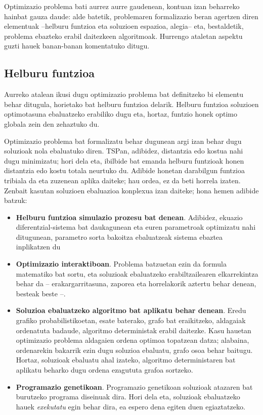 \documentclass[eu]{ifirak}\usepackage[]{graphicx}\usepackage[]{color}
\begin{document}
Optimizazio problema bati aurrez aurre gaudenean, kontuan izan beharreko hainbat gauza daude: alde batetik, problemaren formalizazio beran agertzen diren elementuak --helburu funtzioa eta soluzioen espazioa, alegia-- eta,  bestaldetik, problema ebazteko erabil daitezkeen algoritmoak. Hurrengo ataletan aspektu guzti hauek banan-banan komentatuko ditugu.

\subsection{Helburu funtzioa}

Aurreko atalean ikusi dugu optimizazio problema bat definitzeko bi elementu behar ditugula, horietako bat helburu funtzioa delarik. Helburu funtzioa soluzioen optimotasuna ebaluatzeko erabiliko dugu eta, hortaz, funtzio honek optimo globala zein den zehaztuko du.

Optimizazio problema bat formalizatu behar dugunean argi izan behar dugu soluzioak nola ebaluatuko diren. TSPan, adibidez, distantzia edo kostua nahi dugu minimizatu; hori dela eta, ibilbide bat emanda helburu funtzioak honen distantzia edo kostu totala neurtuko du. Adibide honetan darabilgun funtzioa tribiala da eta zuzenean aplika daiteke; hau ordea, ez da beti horrela izaten. Zenbait kasutan soluzioen ebaluazioa konplexua izan daiteke; hona hemen adibide batzuk:

\begin{itemize}
\item \textbf{Helburu funtzioa simulazio prozesu bat denean}. Adibidez, ekuazio diferentzial-sistema bat daukagunean eta euren parametroak optimizatu nahi ditugunean, parametro sorta bakoitza ebaluatzeak sistema ebaztea inplikatzen du
\item \textbf{Optimizazio interaktiboan}\citep{takagi2001}. Problema batzuetan ezin da formula matematiko bat sortu, eta soluzioak ebaluatzeko erabiltzailearen elkarrekintza behar da -- erakargarritasuna, zaporea eta horrelakorik aztertu behar denean, besteak beste --.
\item \textbf{Soluzioa ebaluatzeko algoritmo bat aplikatu behar denean}. Eredu grafiko probabilistikoetan, esate baterako, grafo bat eraikitzeko, aldagaiak ordenatuta badaude, algoritmo deterministak erabil daitezke. Kasu hauetan optimizazio problema aldagaien ordena optimoa topatzean datza; alabaina, ordenarekin bakarrik ezin dugu soluzioa ebaluatu, grafo osoa behar baitugu. Hortaz, soluzioak ebaluatu ahal izateko, algoritmo deterministaren bat aplikatu beharko dugu ordena ezagututa grafoa sortzeko.
\item \textbf{Programazio genetikoan}. Programazio genetikoan soluzioak atazaren bat burutzeko programa diseinuak dira. Hori dela eta, soluzioak ebaluatzeko hauek \textit{exekutatu} egin behar dira, ea espero dena egiten duen egiaztatzeko.
\end{itemize}
\end{document}
